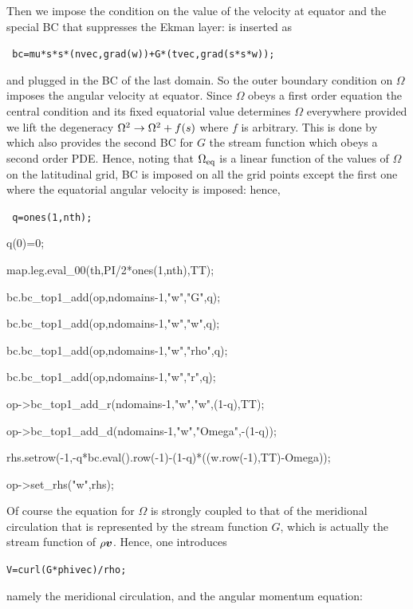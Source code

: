 \bigskip
Then we impose the condition on the value of the velocity at equator and
the special BC that suppresses the Ekman layer:
 is inserted as

\bigskip
\centerline{\tt
bc=mu*s*s*(nvec,grad(w))+G*(tvec,grad(s*s*w));
}

\bigskip
\noindent and plugged in the BC of the last domain. So the outer
boundary condition on $\Omega$ imposes the angular velocity at
equator. Since $\Omega$ obeys a first order equation the central
condition and its fixed equatorial value determines $\Omega$ everywhere
provided we lift the degeneracy $\Omega^2\rightarrow\Omega^2+f(s)$ where $f$ is
arbitrary. This is done by  which also provides the second BC
for $G$ the stream function which obeys a second order PDE. Hence,
noting that $\Omega_{\rm eq}$ is a linear function of the values of
$\Omega$ on the latitudinal grid, BC  is imposed on all the
grid points except the first one where the equatorial angular velocity
is imposed: hence,

\bigskip
\begin{center}
{\tt
        q=ones(1,nth);  \par
        q(0)=0;  \par
        map.leg.eval\_00(th,PI/2*ones(1,nth),TT);  \par
        bc.bc\_top1\_add(op,ndomains-1,"w","G",q);  \par
        bc.bc\_top1\_add(op,ndomains-1,"w","w",q);  \par
        bc.bc\_top1\_add(op,ndomains-1,"w","rho",q);  \par
        bc.bc\_top1\_add(op,ndomains-1,"w","r",q);  \par
        op->bc\_top1\_add\_r(ndomains-1,"w","w",(1-q),TT);  \par
        op->bc\_top1\_add\_d(ndomains-1,"w","Omega",-(1-q));  \par
        rhs.setrow(-1,-q*bc.eval().row(-1)-(1-q)*((w.row(-1),TT)-Omega));  \par
        op->set\_rhs("w",rhs);  \par
}
\end{center}

Of course the equation for $\Omega$ is strongly coupled to that of the
meridional circulation that is represented by the stream function $G$,
which is actually the stream function of $\rho\vv$. Hence, one introduces

\centerline{\tt V=curl(G*phivec)/rho;}
\bigskip
\noindent namely the meridional circulation, and the angular momentum equation:

